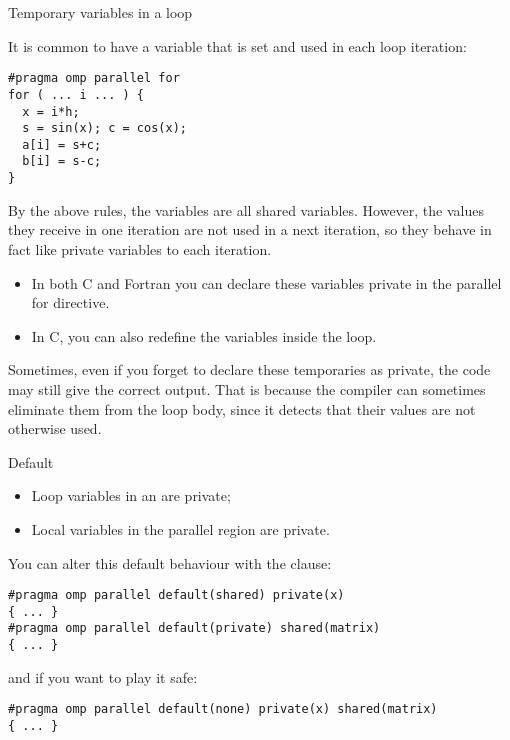  {Temporary variables in a loop}

It is common to have a variable that is set and used in each loop
iteration:
\begin{lstlisting}
#pragma omp parallel for
for ( ... i ... ) {
  x = i*h;
  s = sin(x); c = cos(x);
  a[i] = s+c;
  b[i] = s-c;
}
\end{lstlisting}
By the above rules, the variables  are all shared
variables. However, the values they receive in one iteration are not
used in a next iteration, so they behave in fact like private
variables to each iteration.
\begin{itemize}
\item In both C and Fortran you can declare these variables private in
  the parallel for directive.
\item In C, you can also redefine the variables inside the loop.
\end{itemize}

Sometimes, even if you forget to declare these temporaries as private,
the code may still give the correct output. That is because the
compiler can sometimes eliminate them from the loop body, since it detects that their
values are not otherwise used.

 {Default}

\begin{itemize}
\item Loop variables in an  are private;
\item Local variables in the parallel region are private.
\end{itemize}
You can alter this default behaviour with the  clause:
\begin{lstlisting}
#pragma omp parallel default(shared) private(x)
{ ... }
#pragma omp parallel default(private) shared(matrix)
{ ... }
\end{lstlisting}
and if you want to play it safe:
\begin{lstlisting}
#pragma omp parallel default(none) private(x) shared(matrix)
{ ... }
\end{lstlisting}

